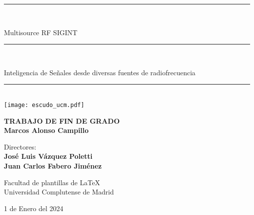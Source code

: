 \begin{titlepage}
	\thispagestyle{empty}

	\begin{center}

		\vspace{1cm}

		\vspace{0.65cm}
		\rule{2in}{0.5pt}\\
		\vspace{0.85cm}

		{\Large Multisource RF SIGINT}\\

		\vspace{0.65cm}
		\rule{2in}{0.5pt}\\
		\vspace{0.85cm}

		{\Large Inteligencia de Señales desde diversas fuentes de radiofrecuencia}\\

		\vspace{0.65cm}
		\rule{2in}{0.5pt}\\



		\vfill
		\texttt{[image: escudo\_ucm.pdf]}
		\vfill

		

		\textbf{TRABAJO DE FIN DE GRADO}\\
		\vspace{0.7cm}
		\textbf{Marcos Alonso Campillo}

		\vspace{1cm}

		Directores:\\
		\textbf{José Luis Vázquez Poletti}\\
		\textbf{Juan Carlos Fabero Jiménez}

		\vspace{1.8cm}
		Facultad de plantillas de \LaTeX\\
		Universidad Complutense de Madrid
		\vspace{0.5cm}
	   
		1 de Enero del 2024

		\vspace{0.2cm}

	\end{center}
\end{titlepage}